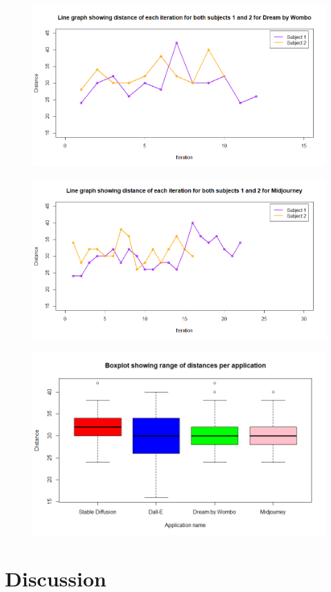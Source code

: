 \documentclass[]{report}
\begin{document}
	
	\begin{figure}
		\centering
		\includegraphics[width=1\linewidth]{LineGraphDBW}
		\caption{}
		\label{fig:linegraphdbw}
	\end{figure}
	
	
	\begin{figure}
		\centering
		\includegraphics[width=1\linewidth]{LineGraphMidJ}
		\caption{}
		\label{fig:linegraphmidj}
	\end{figure}
	
	\begin{figure}
		\centering
		\includegraphics[width=1\linewidth]{boxplotWithAllData}
		\caption{}
		\label{fig:boxplotwithalldata}
	\end{figure}
	
	\section{Discussion}
	
\end{document}
